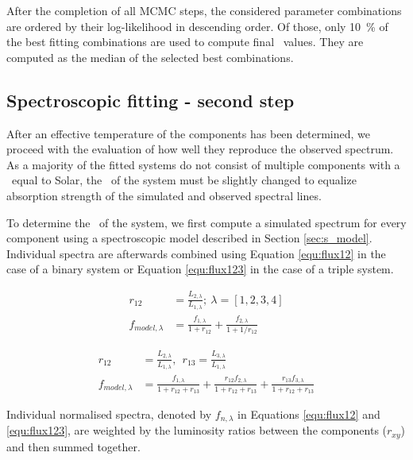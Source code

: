 After the completion of all MCMC steps, the considered parameter combinations are ordered by their log-likelihood in descending order. Of those, only 10~\% of the best fitting combinations are used to compute final \Teffn{[1-3]}\ values. They are computed as the median of the selected best combinations. 

\subsection{Spectroscopic fitting - second step}
\label{sec:spectrum_fit}
After an effective temperature of the components has been determined, we proceed with the evaluation of how well they reproduce the observed spectrum. As a majority of the fitted systems do not consist of multiple components with a \Teff\ equal to Solar, the \Feh\ of the system must be slightly changed to equalize absorption strength of the simulated and observed spectral lines.

To determine the \Feh\ of the system, we first compute a simulated spectrum for every component using a spectroscopic model described in Section \ref{sec:s_model}. Individual spectra are afterwards combined using Equation \ref{equ:flux12} in the case of a binary system or Equation \ref{equ:flux123} in the case of a triple system. 

\begin{equation}
	\label{equ:flux12}
	\begin{aligned}  %
	r_{12} &= \frac{L_{2,\lambda}}{L_{1,\lambda}}; \ \lambda=[1, 2, 3, 4]\\ 
	f_{model,\lambda} &= \frac{f_{1,\lambda}}{1+r_{12}} + \frac{f_{2,\lambda}}{1+1/r_{12}}
	\end{aligned}
\end{equation}

\begin{equation}
	\label{equ:flux123}
	\begin{aligned}
	r_{12} &= \frac{L_{2,\lambda}}{L_{1,\lambda}},\ \ r_{13} = \frac{L_{3,\lambda}}{L_{1,\lambda}}\\ 
	f_{model,\lambda} &= \frac{f_{1,\lambda}}{1 + r_{12} + r_{13}} + \frac{r_{12} f_{2,\lambda}}{1 + r_{12} + r_{13}} + \frac{r_{13} f_{3,\lambda}}{1 + r_{12} + r_{13}}
	\end{aligned}
\end{equation}

Individual normalised spectra, denoted by $f_{n,\lambda}$ in Equations \ref{equ:flux12} and \ref{equ:flux123}, are weighted by the luminosity ratios between the components ($r_{xy}$) and then summed together. 

